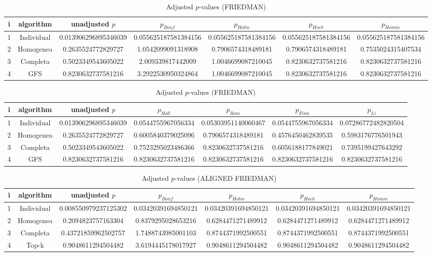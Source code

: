 \documentclass[a4paper,10pt]{article}
\begin{document}
\begin{landscape}
\begin{table}[!htp]
\centering\scriptsize
\caption{Adjusted $p$-values (FRIEDMAN)}
\begin{tabular}{ccccccc}
i&algorithm&unadjusted $p$&$p_{Bonf}$&$p_{Holm}$&$p_{Hoch}$&$p_{Homm}$\\
\hline
1&Individual&0.013906296895346039&0.055625187581384156&0.055625187581384156&0.055625187581384156&0.055625187581384156\\
2&Homogenea&0.2635524772829727&1.0542099091318908&0.7906574318489181&0.7906574318489181&0.7535024315407534\\
3&Completa&0.5023349543605022&2.009339817442009&1.0046699087210045&0.8230632737581216&0.8230632737581216\\
4&GFS&0.8230632737581216&3.2922530950324864&1.0046699087210045&0.8230632737581216&0.8230632737581216\\
\hline
\end{tabular}
\end{table}

\begin{table}[!htp]
\centering\scriptsize
\caption{Adjusted $p$-values (FRIEDMAN)}
\begin{tabular}{ccccccc}
i&algorithm&unadjusted $p$&$p_{Holl}$&$p_{Rom}$&$p_{Finn}$&$p_{Li}$\\
\hline
1&Individual&0.013906296895346039&0.0544755967056334&0.05303951140060467&0.0544755967056334&0.07286772482820504\\
2&Homogenea&0.2635524772829727&0.6005840379025096&0.7906574318489181&0.4576450462839535&0.5983176776501943\\
3&Completa&0.5023349543605022&0.7523295023486366&0.8230632737581216&0.6056188177849021&0.7395199427643292\\
4&GFS&0.8230632737581216&0.8230632737581216&0.8230632737581216&0.8230632737581216&0.8230632737581216\\
\hline
\end{tabular}
\end{table}


\newpage

\begin{table}[!htp]
\centering\scriptsize
\caption{Adjusted $p$-values (ALIGNED FRIEDMAN)}
\begin{tabular}{ccccccc}
i&algorithm&unadjusted $p$&$p_{Bonf}$&$p_{Holm}$&$p_{Hoch}$&$p_{Homm}$\\
\hline
1&Individual&0.008550979237125302&0.03420391694850121&0.03420391694850121&0.03420391694850121&0.03420391694850121\\
2&Homogenea&0.2094823757163304&0.8379295028653216&0.6284471271489912&0.6284471271489912&0.6284471271489912\\
3&Completa&0.43721859962502757&1.7488743985001103&0.8744371992500551&0.8744371992500551&0.8744371992500551\\
4&Top-k&0.9048611294504482&3.6194445178017927&0.9048611294504482&0.9048611294504482&0.9048611294504482\\
\hline
\end{tabular}
\end{table}


\end{landscape}
\end{document}
